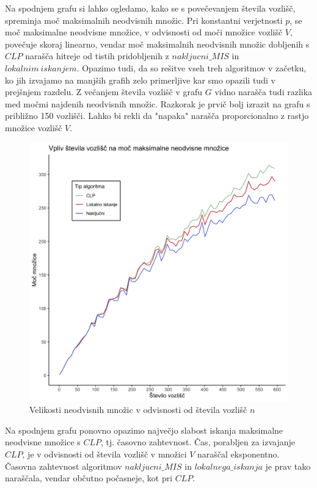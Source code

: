 \documentclass[a4paper, 12pt]{article}
\begin{document}
\noindent Na spodnjem grafu si lahko ogledamo, kako se s povečevanjem števila vozlišč, spreminja moč maksimalnih neodvisnih množic. Pri konstantni verjetnosti $p$, se moč maksimalne neodvisne množice, v odvisnosti od 
moči množice vozlišč $V$, povečuje skoraj linearno, vendar moč maksimalnih neodvisnih množic dobljenih s $CLP$ narašča hitreje od tistih pridobljenih z $nakljucni\_MIS$ in
$lokalnim\ iskanjem$. Opazimo tudi, da so rešitve vseh treh algoritmov v začetku, ko jih izvajamo na manjših grafih zelo primerljive kar smo opazili tudi v prejšnjem razdelu. Z večanjem 
števila vozlišč v grafu $G$ vidno narašča tudi razlika med močmi najdenih neodvisnih množic. Razkorak je prvič bolj izrazit na grafu s približno 150 vozlišči. Lahko bi rekli da "napaka" narašča proporcionalno z rastjo množice vozlišč $V$.


\begin{figure}[h!]
	\begin{center}
		\includegraphics[scale=0.12]{R_koda/voz-moc.png}
		\caption{Velikosti neodvisnih množic v odvisnosti od števila vozlišč $n$}
	\end{center}
\end{figure}


\noindent Na spodnjem grafu ponovno opazimo največjo slabost iskanja maksimalne neodvisne množice s $CLP$, tj. časovno zahtevnost. Čas, porabljen za izvajanje $CLP$, je v odvisnosti od števila vozlišč v množici $V$
naraščal eksponentno. Časovna zahtevnost algoritmov $nakljucni\_MIS$ in $lokalnega\_iskanja$ je prav tako naraščala, vendar občutno počasneje, kot pri $CLP$.
\end{document}
